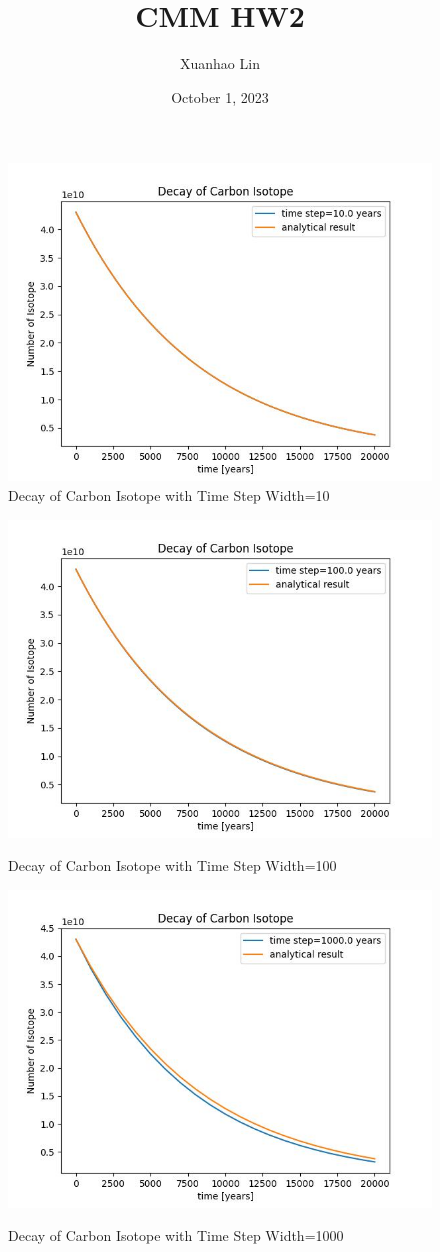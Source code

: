 \documentclass[11pt, oneside]{article}
\title{CMM HW2}
\author{Xuanhao Lin}
\date{October 1, 2023}
\begin{document}
\maketitle

\begin{figure}
    \centering
    \includegraphics[width=0.5\linewidth]{Decay_of_Carbon_Isotope_with_Time_Step_Width=10.0.jpeg}
    \caption{Decay of Carbon Isotope with Time Step Width=10}
    \label{fig:1}
\end{figure}

\begin{figure}
    \centering
    \includegraphics[width=0.5\linewidth]{Decay_of_Carbon_Isotope_with_Time_Step_Width=100.0.jpeg}
    \label{fig:2}
    \caption{Decay of Carbon Isotope with Time Step Width=100}
\end{figure}

\begin{figure}
    \centering
    \includegraphics[width=0.5\linewidth]{Decay_of_Carbon_Isotope_with_Time_Step_Width=1000.0.jpeg}
    \label{fig:3}
    \caption{Decay of Carbon Isotope with Time Step Width=1000}
\end{figure}
\end{document}
